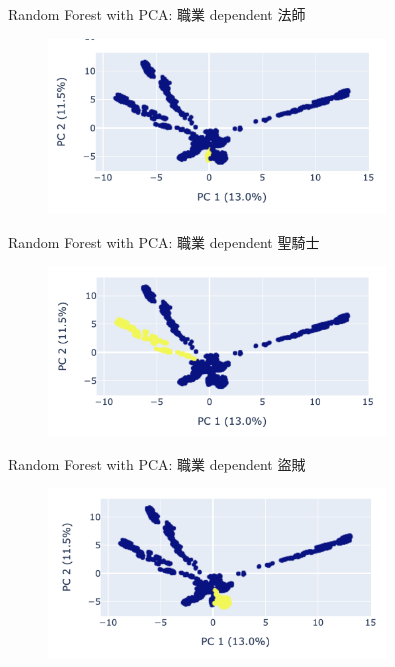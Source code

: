 \documentclass[12pt]{beamer}
\begin{document}
\begin{frame}[fragile]{Random Forest with PCA: 職業 dependent 法師}
	\begin{figure}
		\begin{center}
			\includegraphics[width=0.8\textwidth]{figure/plot/2_mage.png}
		\end{center}
	\end{figure}
\end{frame}
\begin{frame}[fragile]{Random Forest with PCA: 職業 dependent 聖騎士}
	\begin{figure}
		\begin{center}
			\includegraphics[width=0.8\textwidth]{figure/plot/2_paladin.png}
		\end{center}
	\end{figure}
\end{frame}
\begin{frame}[fragile]{Random Forest with PCA: 職業 dependent 盜賊}
	\begin{figure}
		\begin{center}
			\includegraphics[width=0.8\textwidth]{figure/plot/2_rouge.png}
		\end{center}
	\end{figure}
\end{frame}
\end{document}
